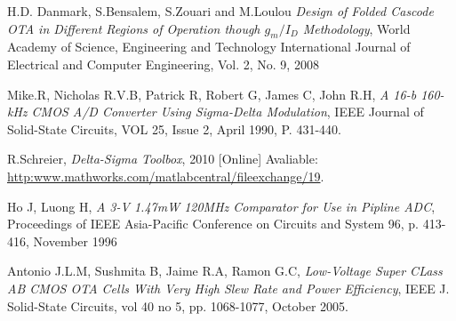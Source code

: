 \begin{thebibliography}{9}
H.D. Danmark, S.Bensalem, S.Zouari and M.Loulou
\textit{Design of Folded Cascode OTA in Different Regions of Operation though $g_m/I_D$ Methodology},
World Academy of Science, Engineering and Technology International Journal of Electrical and Computer Engineering, Vol. 2, No. 9, 2008

Mike.R, Nicholas R.V.B, Patrick R, Robert G, James C, John R.H,
\textit{A 16-b 160-kHz CMOS A/D Converter Using Sigma-Delta Modulation},
IEEE Journal of Solid-State Circuits, VOL 25, Issue 2, April 1990, P. 431-440.

R.Schreier,
\textit{Delta-Sigma Toolbox},
2010
[Online]
Avaliable:
\url{http:www.mathworks.com/matlabcentral/fileexchange/19}.

Ho J, Luong H,
\textit{A 3-V 1.47mW 120MHz Comparator for Use in Pipline ADC},
Proceedings of IEEE Asia-Pacific Conference on Circuits and System 96, p. 413-416, November 1996

Antonio J.L.M, Sushmita B, Jaime R.A, Ramon G.C,
\textit{Low-Voltage Super CLass AB CMOS OTA Cells With Very High Slew Rate and Power Efficiency},
IEEE J. Solid-State Circuits, vol 40 no 5, pp. 1068-1077, October 2005.
\end{thebibliography}

